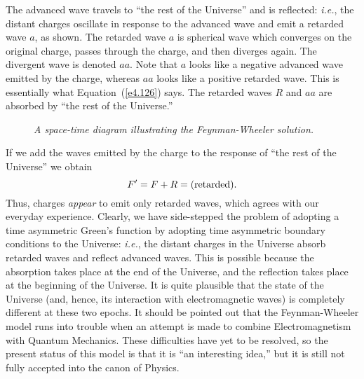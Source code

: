 The advanced wave travels to ``the rest of the Universe'' and is reflected: {\em i.e.}, the 
distant charges oscillate in response to the advanced wave and emit a retarded wave $a$, 
as shown. The retarded wave $a$ is spherical wave which
converges on the original charge, passes through the charge, and then diverges again. The
divergent wave is denoted $aa$. Note that $a$ looks like a negative advanced wave emitted by
the charge, whereas $aa$ looks like a positive retarded wave. This is
essentially what Equation~(\ref{e4.126}) says. The retarded waves $R$ and $aa$ are absorbed by 
``the rest of the Universe.''  
\begin{figure}
\epsfysize=2.5in
\centerline{}
\caption{\em A space-time diagram illustrating the  Feynman-Wheeler solution.}\label{f39}
\end{figure}

If we add the waves emitted by the charge to the response of ``the rest of the Universe'' 
we obtain
\begin{equation}
F' = F+R = ({\rm retarded}).
\end{equation}
Thus, charges {\em appear} to emit only retarded waves, which agrees with our everyday experience.
Clearly, we have side-stepped the problem of adopting a time asymmetric Green's function
by adopting time asymmetric boundary conditions to the Universe: {\em i.e.}, the distant charges in the
Universe absorb retarded waves and reflect  advanced waves. This is possible because the
absorption takes place at the end of the Universe, and the reflection takes place at
the beginning of the Universe. It is quite plausible that the
state of the Universe (and, hence, its interaction with electromagnetic
waves) is completely different at these two epochs. It should be pointed out that the Feynman-Wheeler
model runs into trouble when an attempt is made to combine Electromagnetism with Quantum Mechanics. 
These difficulties have yet to be resolved, so the present status of this model
is that it is  ``an interesting
idea,'' but it is still not fully accepted into the canon of Physics. 

